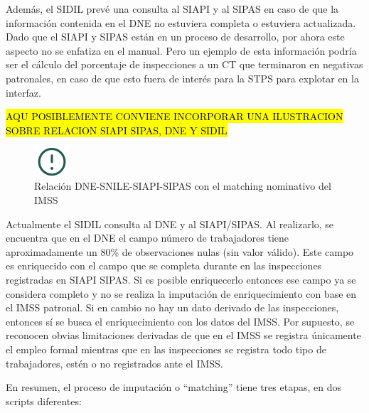 \documentclass[
]{article}
\begin{document}
Además, el SIDIL prevé una consulta al SIAPI y al SIPAS en caso de que la información contenida en el DNE no estuviera completa o estuviera actualizada. Dado que el SIAPI y SIPAS están en un proceso de desarrollo, por ahora este aspecto no se enfatiza en el manual. Pero un ejemplo de esta información podría ser el cálculo del porcentaje de inspecciones a un CT que terminaron en negativas patronales, en caso de que esto fuera de interés para la STPS para explotar en la interfaz.

\hl{AQU POSIBLEMENTE CONVIENE INCORPORAR UNA ILUSTRACION SOBRE RELACION SIAPI SIPAS, DNE Y SIDIL}

\begin{figure}
\includegraphics[width=50px,style="float:left; background-color: #f5f5f5; padding-right:1em"]{images-1/important-icon} \caption{Relación DNE-SNILE-SIAPI-SIPAS con el matching nominativo del IMSS}\label{fig:relacionDNESNILESIAPISIPAS}
\end{figure}

\begin{rmdcomment}
Actualmente el SIDIL consulta al DNE y al SIAPI/SIPAS. Al realizarlo, se
encuentra que en el DNE el campo número de trabajadores tiene
aproximadamente un 80\% de observaciones nulas (sin valor válido). Este
campo es enriquecido con el campo que se completa durante en las
inspecciones registradas en SIAPI SIPAS. Si es posible enriquecerlo
entonces ese campo ya se considera completo y no se realiza la
imputación de enriquecimiento con base en el IMSS patronal. Si en cambio
no hay un dato derivado de las inspecciones, entonces sí se busca el
enriquecimiento con los datos del IMSS. Por supuesto, se reconocen
obvias limitaciones derivadas de que en el IMSS se registra únicamente
el empleo formal mientras que en las inspecciones se registra todo tipo
de trabajadores, estén o no registrados ante el IMSS.
\end{rmdcomment}

En resumen, el proceso de imputación o ``matching'' tiene tres etapas, en dos scripts diferentes:
\end{document}
